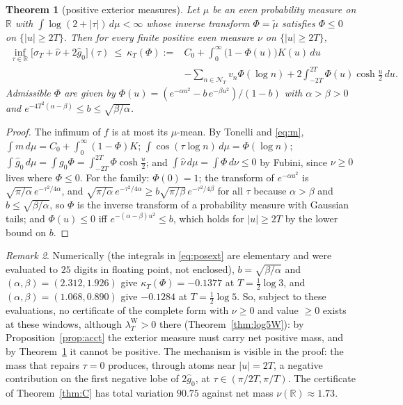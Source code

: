 \documentclass[11pt]{amsart}
\newtheorem{theorem}{Theorem}[section]
\theoremstyle{definition}
\theoremstyle{remark}
\newtheorem{remark}[theorem]{Remark}
\newcommand{\R}{\mathbb R}
\newcommand{\lamW}{\lambda^{\mathrm W}_T}
\newcommand{\sT}{\sigma_T}
\newcommand{\gh}[1]{\widehat g_{#1}}
\newcommand{\nuh}{\widehat\nu}
\newcommand{\NT}{\mathcal N_T}
\begin{document}
\begin{theorem}[positive exterior measures]\label{thm:posext}
Let $\mu$ be an even probability measure on $\R$ with $\int\log(2+|\tau|)\,d\mu<\infty$ whose inverse transform
$\Phi=\check\mu$ satisfies $\Phi\le0$ on $\{|u|\ge2T\}$. Then for every finite positive even measure $\nu$ on
$\{|u|\ge2T\}$,
\begin{equation}\label{eq:posext}
\begin{split}
\inf_{\tau\in\R}\big[\sT+\nuh+2\gh0\big](\tau)\ \le\ \kappa_T(\Phi):={}&C_0+\int_0^\infty\big(1-\Phi(u)\big)K(u)\,du\\
&-\sum_{n\in\NT}v_n\Phi(\log n)+2\int_{-2T}^{2T}\Phi(u)\cosh\tfrac u2\,du .
\end{split}
\end{equation}
Admissible $\Phi$ are given by $\Phi(u)=(e^{-\alpha u^2}-b\,e^{-\beta u^2})/(1-b)$ with $\alpha>\beta>0$ and
$e^{-4T^2(\alpha-\beta)}\le b\le\sqrt{\beta/\alpha}$.
\end{theorem}
\begin{proof}
The infimum of $f$ is at most its $\mu$-mean. By Tonelli and \eqref{eq:m},
$\int m\,d\mu=C_0+\int_0^\infty(1-\Phi)K$; $\int\cos(\tau\log n)\,d\mu=\Phi(\log n)$;
$\int\gh0\,d\mu=\int g_0\Phi=\int_{-2T}^{2T}\Phi\cosh\frac u2$; and $\int\nuh\,d\mu=\int\Phi\,d\nu\le0$ by Fubini,
since $\nu\ge0$ lives where $\Phi\le0$. For the family: $\Phi(0)=1$; the transform of $e^{-\alpha u^2}$ is
$\sqrt{\pi/\alpha}\,e^{-\tau^2/4\alpha}$, and $\sqrt{\pi/\alpha}\,e^{-\tau^2/4\alpha}\ge b\sqrt{\pi/\beta}\,e^{-\tau^2/4\beta}$
for all $\tau$ because $\alpha>\beta$ and $b\le\sqrt{\beta/\alpha}$, so $\Phi$ is the inverse transform of a
probability measure with Gaussian tails; and $\Phi(u)\le0$ iff $e^{-(\alpha-\beta)u^2}\le b$, which holds for
$|u|\ge2T$ by the lower bound on $b$.
\end{proof}

\begin{remark}\label{rem:posext}
Numerically (the integrals in \eqref{eq:posext} are elementary and were evaluated to $25$ digits in floating
point, not enclosed), $b=\sqrt{\beta/\alpha}$ and $(\alpha,\beta)=(2.312,1.926)$ give
$\kappa_T(\Phi)=-0.1377$ at $T=\frac12\log3$, and $(\alpha,\beta)=(1.068,0.890)$ give $-0.1284$ at $T=\frac12\log5$.
So, subject to these evaluations, no certificate of the complete form with $\nu\ge0$ and value $\ge0$ exists at these
windows, although $\lamW>0$ there (Theorem~\ref{thm:log5W}): by Proposition~\ref{prop:acct} the exterior measure must carry net
positive mass, and by Theorem~\ref{thm:posext} it cannot be positive. The mechanism is visible in the proof: the
mass that repairs $\tau=0$ produces, through atoms near $|u|=2T$, a negative contribution on the first negative lobe
of $2\gh0$, at $\tau\in(\pi/2T,\pi/T)$. The certificate of Theorem~\ref{thm:C} has total variation $90.75$ against net
mass $\nu(\R)\approx1.73$.
\end{remark}
\end{document}
